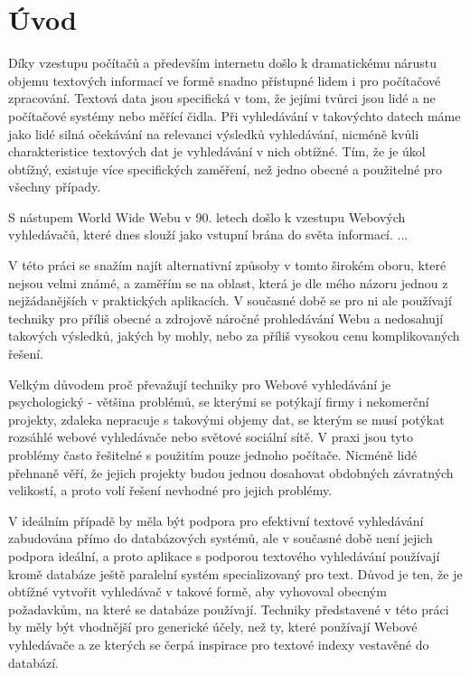 \documentclass[12pt,letterpaper,oneside,openright]{book}
\begin{document}
\frontmatter
{\hypersetup{hidelinks}
    \tableofcontents
}

\mainmatter
\chapter{Úvod}
Díky vzestupu počítačů a především internetu došlo k dramatickému nárustu
objemu textových informací ve formě snadno přístupné lidem i pro počítačové
zpracování. Textová data jsou specifická v tom, že jejími tvůrci jsou lidé a ne
počítačové systémy nebo měřící čidla. Při vyhledávání v takovýchto datech máme
jako lidé silná očekávání na relevanci výsledků vyhledávání, nicméně kvůli
charakteristice textových dat je vyhledávání v nich obtížné. Tím, že je úkol
obtížný, existuje více specifických zaměření, než jedno obecné a použitelné pro
všechny případy.

S nástupem World Wide Webu v 90. letech došlo k vzestupu Webových vyhledávačů,
které dnes slouží jako vstupní brána do světa informací.
...

V této práci se snažím najít alternativní způsoby v tomto širokém oboru, které
nejsou velmi známé, a zaměřím se na oblast, která je dle mého názoru jednou z
nejžádanějších v praktických aplikacích. V současné době se pro ni ale
používají techniky pro příliš obecné a zdrojově náročné prohledávání Webu a
nedosahují takových výsledků, jakých by mohly, nebo za příliš vysokou cenu
komplikovaných řešení.

Velkým důvodem proč převažují techniky pro Webové vyhledávání je psychologický
- většina problémů, se kterými se potýkají firmy i nekomerční projekty, zdaleka
nepracuje s takovými objemy dat, se kterým se musí potýkat rozsáhlé webové
vyhledávače nebo světové sociální sítě. V praxi jsou tyto problémy často
řešitelné s použitím pouze jednoho počítače. Nicméně lidé přehnaně věří, že
jejich projekty budou jednou dosahovat obdobných závratných velikostí, a proto
volí řešení nevhodné pro jejich problémy.

V ideálním případě by měla být podpora pro efektivní textové vyhledávání
zabudována přímo do databázových systémů, ale v současné době není jejich
podpora ideální, a proto aplikace s podporou textového vyhledávání používají
kromě databáze ještě paralelní systém specializovaný pro text. Důvod je ten, že
je obtížné vytvořit vyhledávač v takové formě, aby vyhovoval obecným
požadavkům, na které se databáze používají. Techniky představené v této práci
by měly být vhodnější pro generické účely, než ty, které používají Webové
vyhledávače a ze kterých se čerpá inspirace pro textové indexy vestavěné do
databází.
\end{document}

